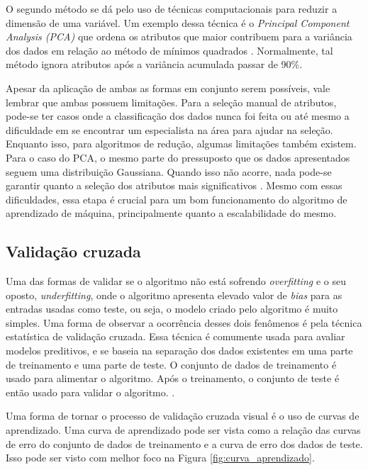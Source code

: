 O segundo método se dá pelo uso de técnicas computacionais para reduzir a
dimensão de uma variável. Um exemplo dessa técnica é o \textit{Principal
Component Analysis (PCA) } que ordena os atributos que maior contribuem para a
variância dos dados em relação ao método de mínimos quadrados
\cite{amatriain2011data}. Normalmente, tal método ignora atributos após a
variância acumulada passar de 90\%.

Apesar da aplicação de ambas as formas em conjunto serem possíveis, vale lembrar
que ambas possuem limitações. Para a seleção manual de atributos, pode-se ter
casos onde a classificação dos dados nunca foi feita ou até mesmo a dificuldade
em se encontrar um especialista na área para ajudar na seleção. Enquanto isso,
para algoritmos de redução, algumas limitações também existem. Para o caso do
PCA, o mesmo parte do pressuposto que os dados apresentados seguem uma
distribuição Gaussiana. Quando isso não acorre, nada pode-se garantir quanto a
seleção dos atributos mais significativos \cite{amatriain2011data}. Mesmo com
essas dificuldades, essa etapa é crucial para um bom funcionamento do algoritmo
de aprendizado de máquina, principalmente quanto a escalabilidade do mesmo.


\subsection{Validação cruzada}

Uma das formas de validar se o algoritmo não está sofrendo \textit{overfitting}
e o seu oposto, \textit{underfitting}, onde o algoritmo apresenta elevado valor
de \textit{bias} para as entradas usadas como teste, ou seja, o modelo criado
pelo algoritmo é muito simples. Uma forma de observar a ocorrência desses dois
fenômenos é pela técnica estatística de validação cruzada. Essa técnica é
comumente usada para avaliar modelos preditivos, e se baseia na separação dos
dados existentes em uma parte de treinamento e uma parte de teste. O conjunto de
dados de treinamento é usado para alimentar o algoritmo. Após o treinamento,
o conjunto de teste é então usado para validar o algoritmo. \cite{araujo2011apprecommender}.

Uma forma de tornar o processo de validação cruzada visual é o uso de curvas de
aprendizado. Uma curva de aprendizado pode ser vista como a relação das curvas
de erro do conjunto de dados de treinamento e a curva de erro dos dados de teste. Isso pode
ser visto com melhor foco na Figura \ref{fig:curva_aprendizado}.

